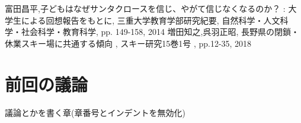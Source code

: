 \documentclass[a4j, twocolumn, 9pt]{jsarticle}
\begin{document}
\begin{thebibliography}{99}
   富田昌平,子どもはなぜサンタクロースを信じ、やがて信じなくなるのか？ : 大学生による回想報告をもとに, 三重大学教育学部研究紀要, 自然科学・人文科学・社会科学・教育科学, pp. 149-158, 2014
   増田知之,呉羽正昭, 長野県の閉鎖・休業スキー場に共通する傾向 , スキー研究15巻1号 , pp.12-35, 2018 
\end{thebibliography}

\section*{前回の議論}
\noindent
議論とかを書く章(章番号とインデントを無効化)
\end{document}
